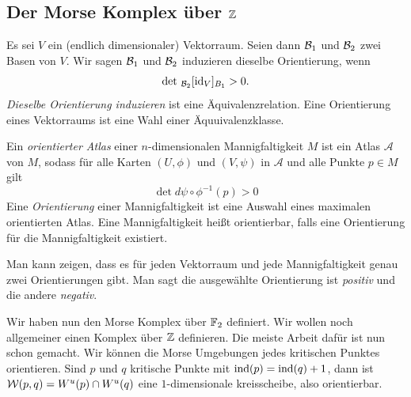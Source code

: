 \subsection*{Der Morse Komplex über \texorpdfstring{${ \mathbb Z }$}{TEXT}}

\begin{definition}
    Es sei $V$ ein (endlich dimensionaler) Vektorraum. Seien dann $\mathcal{B}_1$ und $\mathcal{B}_2$ zwei Basen von $V$.
    Wir sagen $\mathcal{B}_1$ und $\mathcal{B}_2$ induzieren dieselbe Orientierung, wenn 
    \[ \det \, _{\mathcal{B}_2}[{ \operatorname{id} }_V]_{B_1} > 0 . \]
    \textit{Dieselbe Orientierung induzieren} ist eine Äquivalenzrelation. Eine Orientierung eines 
    Vektorraums ist eine Wahl einer Äquuivalenzklasse.

    Ein \textit{orientierter Atlas} einer $n$-dimensionalen Mannigfaltigkeit $M$ ist ein Atlas 
    $\mathcal{A}$ von $M$, sodass für alle Karten $(U, \phi)$ und $(V, \psi)$ in $\mathcal{A}$ 
    und alle Punkte $p \in M$ gilt
    \[ \det d \psi \circ \phi^{-1} (p) > 0 \]
    Eine \textit{Orientierung} einer Mannigfaltigkeit ist eine Auswahl eines maximalen orientierten Atlas.
    Eine Mannigfaltigkeit heißt orientierbar, falls eine Orientierung für die Mannigfaltigkeit existiert.
\end{definition}

\begin{remark}
    Man kann zeigen, dass es für jeden Vektorraum und jede Mannigfaltigkeit genau zwei Orientierungen
    gibt. Man sagt die ausgewählte Orientierung ist \textit{positiv} und die andere \textit{negativ}.
\end{remark}

Wir haben nun den Morse Komplex über ${ \mathbb F }_2$ definiert. Wir wollen noch allgemeiner einen Komplex
über ${ \mathbb Z }$ definieren. Die meiste Arbeit dafür ist nun schon gemacht. 
Wir können die Morse Umgebungen jedes kritischen Punktes orientieren. Sind $p$ und $q$ 
kritische Punkte mit ${ \operatorname{ind} } (p) = { \operatorname{ind} }(q) + 1$, dann ist 
$\mathcal{W} (p, q) = { W^u } (p) \cap { W^u } (q)$ eine $1$-dimensionale kreisscheibe, also 
orientierbar. 
